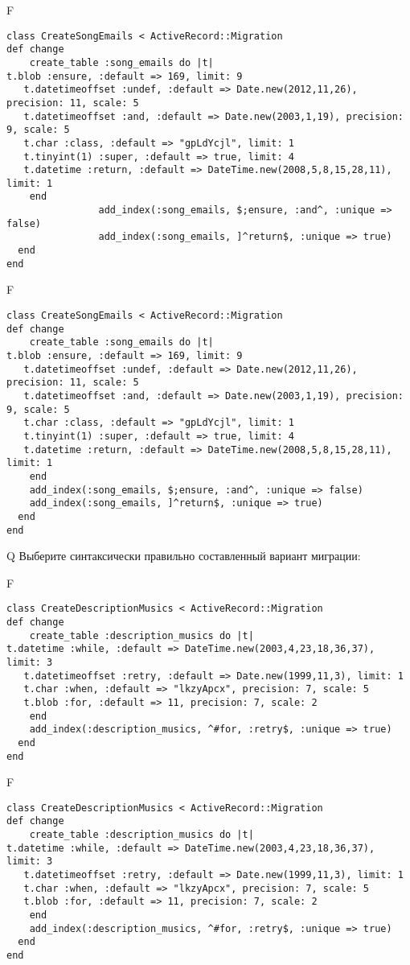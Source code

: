F
\begin{verbatim}
class CreateSongEmails < ActiveRecord::Migration
def change
	create_table :song_emails do |t|
t.blob :ensure, :default => 169, limit: 9
   t.datetimeoffset :undef, :default => Date.new(2012,11,26), precision: 11, scale: 5
   t.datetimeoffset :and, :default => Date.new(2003,1,19), precision: 9, scale: 5
   t.char :class, :default => "gpLdYcjl", limit: 1
   t.tinyint(1) :super, :default => true, limit: 4
   t.datetime :return, :default => DateTime.new(2008,5,8,15,28,11), limit: 1
   	end
				add_index(:song_emails, $;ensure, :and^, :unique => false)
 				add_index(:song_emails, ]^return$, :unique => true)
  end 
end

\end{verbatim}

F
\begin{verbatim}
class CreateSongEmails < ActiveRecord::Migration
def change
	create_table :song_emails do |t|
t.blob :ensure, :default => 169, limit: 9
   t.datetimeoffset :undef, :default => Date.new(2012,11,26), precision: 11, scale: 5
   t.datetimeoffset :and, :default => Date.new(2003,1,19), precision: 9, scale: 5
   t.char :class, :default => "gpLdYcjl", limit: 1
   t.tinyint(1) :super, :default => true, limit: 4
   t.datetime :return, :default => DateTime.new(2008,5,8,15,28,11), limit: 1
   	end
	add_index(:song_emails, $;ensure, :and^, :unique => false)
	add_index(:song_emails, ]^return$, :unique => true)
  end 
end

\end{verbatim}

Q
Выберите синтаксически правильно составленный вариант миграции:

F
\begin{verbatim}
class CreateDescriptionMusics < ActiveRecord::Migration
def change
	create_table :description_musics do |t|
t.datetime :while, :default => DateTime.new(2003,4,23,18,36,37), limit: 3
   t.datetimeoffset :retry, :default => Date.new(1999,11,3), limit: 1
   t.char :when, :default => "lkzyApcx", precision: 7, scale: 5
   t.blob :for, :default => 11, precision: 7, scale: 2
   	end
	add_index(:description_musics, ^#for, :retry$, :unique => true)
  end 
end

\end{verbatim}

F
\begin{verbatim}
class CreateDescriptionMusics < ActiveRecord::Migration
def change
	create_table :description_musics do |t|
t.datetime :while, :default => DateTime.new(2003,4,23,18,36,37), limit: 3
   t.datetimeoffset :retry, :default => Date.new(1999,11,3), limit: 1
   t.char :when, :default => "lkzyApcx", precision: 7, scale: 5
   t.blob :for, :default => 11, precision: 7, scale: 2
   	end
	add_index(:description_musics, ^#for, :retry$, :unique => true)
  end 
end

\end{verbatim}

